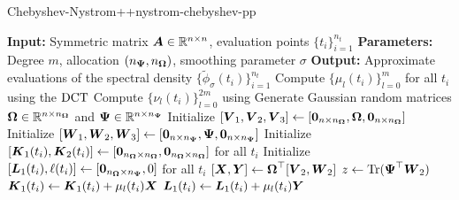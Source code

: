 \documentclass[12pt]{article}
\begin{document}
\begin{algo}{Chebyshev-Nystrom++}{nystrom-chebyshev-pp}
\begin{algorithmic}[1]
    \Statex \textbf{Input:} Symmetric matrix $\boldsymbol{A} \in \mathbb{R}^{n \times n}$, evaluation points $\{t_i\}_{i=1}^{n_t}$
    \Statex \textbf{Parameters:} Degree $m$, allocation $(n_{\boldsymbol{\Psi}}, n_{\boldsymbol{\Omega}})$,  smoothing parameter $\sigma$
    \Statex \textbf{Output:} Approximate evaluations of the spectral density $\{\widetilde{\phi}_{\sigma}(t_i)\}_{i=1}^{n_t}$
    \State Compute $\{\mu_l(t_i)\}_{l=0}^{m}$ for all $t_i$ using the $\operatorname{DCT}$ 
    \State Compute $\{\nu_l(t_i)\}_{l=0}^{2m}$ using %
    \State Generate Gaussian random matrices $\boldsymbol{\Omega} \in \mathbb{R}^{n \times n_{\boldsymbol{\Omega}}}$ and $\boldsymbol{\Psi} \in \mathbb{R}^{n \times n_{\boldsymbol{\Psi}}}$%
    \State Initialize $[\boldsymbol{V}_1, \boldsymbol{V}_2, \boldsymbol{V}_3] \gets [\boldsymbol{0}_{n \times n_{\boldsymbol{\Omega}}}, \boldsymbol{\boldsymbol{\Omega}}, \boldsymbol{0}_{n \times n_{\boldsymbol{\Omega}}}]$
    \State Initialize $[\boldsymbol{W}_1, \boldsymbol{W}_2, \boldsymbol{W}_3] \gets [\boldsymbol{0}_{n \times n_{\boldsymbol{\Psi}}}, \boldsymbol{\Psi}, \boldsymbol{0}_{n \times n_{\boldsymbol{\Psi}}}]$
    \State Initialize $[\boldsymbol{K}_1(t_i), \boldsymbol{K}_2(t_i)] \gets [\boldsymbol{0}_{n_{\boldsymbol{\Omega}} \times n_{\boldsymbol{\Omega}}}, \boldsymbol{0}_{n_{\boldsymbol{\Omega}} \times n_{\boldsymbol{\Omega}}}]$ for all $t_i$
    \State Initialize $[\boldsymbol{L}_1(t_i), \ell(t_i)] \gets [\boldsymbol{0}_{n_{\boldsymbol{\Omega}} \times n_{\boldsymbol{\Psi}}}, 0]$ for all $t_i$
    \State $[\boldsymbol{X}, \boldsymbol{Y}] \gets \boldsymbol{\boldsymbol{\Omega}}^{\top} [\boldsymbol{V}_2, \boldsymbol{W}_2]$  
      \State $z \gets \operatorname{Tr}(\boldsymbol{\Psi}^{\top} \boldsymbol{W}_2)$
            \State $\boldsymbol{K}_1(t_i) \gets \boldsymbol{K}_1(t_i) + \mu_l(t_i) \boldsymbol{X}$ 
            \State $\boldsymbol{L}_1(t_i) \gets \boldsymbol{L}_1(t_i) + \mu_l(t_i) \boldsymbol{Y}$ 

\end{algorithmic}
\end{algo}
\end{document}
